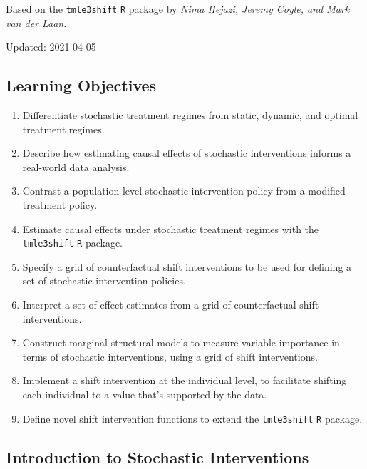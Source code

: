 \documentclass[12pt, krantz2,]{krantz}
\providecommand{\tightlist}{%
  \setlength{\itemsep}{0pt}\setlength{\parskip}{0pt}}
\theoremstyle{definition}
\theoremstyle{definition}
\theoremstyle{definition}
\newcommand{\1}{\mathbbm{1}}
\begin{document}
Based on the \href{https://github.com/tlverse/tmle3shift}{\texttt{tmle3shift} \texttt{R} package}
by \emph{Nima Hejazi, Jeremy Coyle, and Mark van der Laan}.

Updated: 2021-04-05

\hypertarget{learning-objectives-5}{%
\subsection{Learning Objectives}\label{learning-objectives-5}}

\begin{enumerate}
\def\labelenumi{\arabic{enumi}.}
\tightlist
\item
  Differentiate stochastic treatment regimes from static, dynamic, and optimal
  treatment regimes.
\item
  Describe how estimating causal effects of stochastic interventions informs a
  real-world data analysis.
\item
  Contrast a population level stochastic intervention policy from a modified
  treatment policy.
\item
  Estimate causal effects under stochastic treatment regimes with the
  \texttt{tmle3shift} \texttt{R} package.
\item
  Specify a grid of counterfactual shift interventions to be used for defining
  a set of stochastic intervention policies.
\item
  Interpret a set of effect estimates from a grid of counterfactual shift
  interventions.
\item
  Construct marginal structural models to measure variable importance in terms
  of stochastic interventions, using a grid of shift interventions.
\item
  Implement a shift intervention at the individual level, to facilitate
  shifting each individual to a value that's supported by the data.
\item
  Define novel shift intervention functions to extend the \texttt{tmle3shift} \texttt{R}
  package.
\end{enumerate}

\hypertarget{introduction-to-stochastic-interventions}{%
\subsection{Introduction to Stochastic Interventions}\label{introduction-to-stochastic-interventions}}
\end{document}
